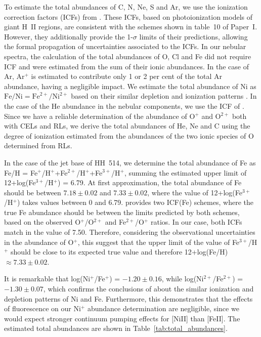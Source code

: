 \documentclass[fleqn,usenatbib]{mnras}
\begin{document}
To estimate the total abundances of C, N, Ne, S and Ar, we use the ionization correction factors (ICFs) from \citet{Amayo2021}. These ICFs, based on photoionization models of giant H~II regions, are consistent with the schemes shown in table~10 of Paper~I. However, they additionally provide the 1-$\sigma$ limits of their predictions, allowing the formal propagation of uncertainties associated to the ICFs. In our nebular spectra, the calculation of the total abundances of O, Cl and Fe did not require ICF and were estimated from the sum of their ionic abundances. In the case of Ar, Ar$^+$ is estimated to contribute only 1 or 2 per cent of the total Ar abundance, having a negligible impact. We estimate the total abundance of Ni as $\text{Fe/Ni}=\text{Fe}^{2+}/\text{Ni}^{2+}$ based on their similar depletion and ionization patterns \citep[][]{mendez2021-2}. In the case of the He abundance in the nebular components, we use the ICF of \citet{kunthsargent83}. Since we have a reliable determination of the abundance of O$^+$ and O$^{2+}$ both with CELs and RLs, we derive the total abundances of He, Ne and C using the degree of ionization estimated from the abundances of the two ionic species of O determined from RLs. 


In the case of the jet base of HH~514, we determine the total abundance of Fe as Fe/H = Fe$^{+}$/H$^{+}$+Fe$^{2+}$/H$^{+}$+Fe$^{3+}$/H$^{+}$, summing the estimated upper limit of 12+log(Fe$^{3+}$/H$^{+}$) = 6.79. At first approximation, the total abundance of Fe should be between $7.18 \pm 0.02$ and $7.33 \pm 0.02$, where the value of 12+log(Fe$^{3+}$/H$^{+}$) takes values between 0 and 6.79.  \citet{rodriguez05} provides two ICF(Fe) schemes, where the true Fe abundance should be between the limits predicted by both schemes, based on the observed O$^{+}$/O$^{2+}$ and Fe$^{2+}$/O$^{+}$ ratios. In our case, both ICFs match in the value of 7.50. Therefore, considering the observational uncertainties in the abundance of O$^{+}$, this suggest that the upper limit of the value of Fe$^{3+}$/H$^{+}$ should be close to its expected true value and therefore 12+log(Fe/H)$\approx 7.33 \pm 0.02$. 

It is remarkable that log(Ni$^{+}$/Fe$^{+}$) = $-1.20 \pm 0.16$, while log(Ni$^{2+}$/Fe$^{2+}$) = $-1.30 \pm 0.07$, which confirms the conclusions of \citet{mendez2021-2} about the similar ionization and depletion patterns of Ni and Fe. Furthermore, this demonstrates that the effects of fluorescence on our Ni$^{+}$ abundance determination are negligible, since we would expect stronger continuum pumping effects for [Ni\thinspace II] than [Fe\thinspace II]. The estimated total abundances are shown in Table~\ref{tab:total_abundances}.
\end{document}
